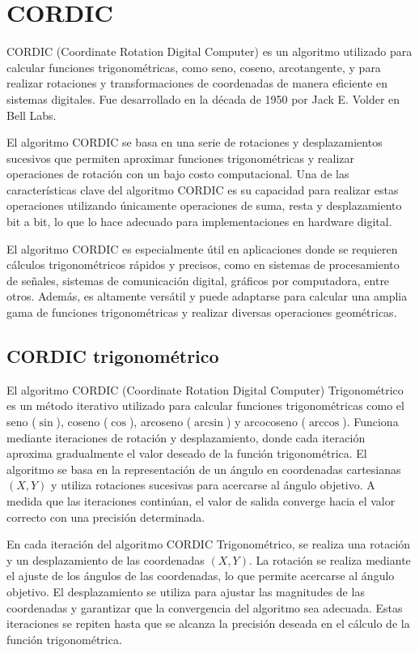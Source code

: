 \documentclass[12pt,a4paper, twoside]{article} %
\begin{document}
\newpage

\section{CORDIC}
\label{sec:orgc1c4017}

CORDIC (Coordinate Rotation Digital Computer) es un algoritmo utilizado para calcular funciones trigonométricas, como seno, coseno, arcotangente, y para realizar rotaciones y transformaciones de coordenadas de manera eficiente en sistemas digitales. Fue desarrollado en la década de 1950 por Jack E. Volder en Bell Labs.

El algoritmo CORDIC se basa en una serie de rotaciones y desplazamientos sucesivos que permiten aproximar funciones trigonométricas y realizar operaciones de rotación con un bajo costo computacional. Una de las características clave del algoritmo CORDIC es su capacidad para realizar estas operaciones utilizando únicamente operaciones de suma, resta y desplazamiento bit a bit, lo que lo hace adecuado para implementaciones en hardware digital.

El algoritmo CORDIC es especialmente útil en aplicaciones donde se requieren cálculos trigonométricos rápidos y precisos, como en sistemas de procesamiento de señales, sistemas de comunicación digital, gráficos por computadora, entre otros. Además, es altamente versátil y puede adaptarse para calcular una amplia gama de funciones trigonométricas y realizar diversas operaciones geométricas.



\subsection{CORDIC trigonométrico}
\label{sec:orgdaca22c}


El algoritmo CORDIC (Coordinate Rotation Digital Computer) Trigonométrico es un método iterativo utilizado para calcular funciones trigonométricas como el seno ($\sin$), coseno ($\cos$), arcoseno ($\arcsin$) y arcocoseno ($\arccos$). Funciona mediante iteraciones de rotación y desplazamiento, donde cada iteración aproxima gradualmente el valor deseado de la función trigonométrica. El algoritmo se basa en la representación de un ángulo en coordenadas cartesianas $(X, Y)$ y utiliza rotaciones sucesivas para acercarse al ángulo objetivo. A medida que las iteraciones continúan, el valor de salida converge hacia el valor correcto con una precisión determinada.

En cada iteración del algoritmo CORDIC Trigonométrico, se realiza una rotación y un desplazamiento de las coordenadas $(X, Y)$. La rotación se realiza mediante el ajuste de los ángulos de las coordenadas, lo que permite acercarse al ángulo objetivo. El desplazamiento se utiliza para ajustar las magnitudes de las coordenadas y garantizar que la convergencia del algoritmo sea adecuada. Estas iteraciones se repiten hasta que se alcanza la precisión deseada en el cálculo de la función trigonométrica.
\end{document}
